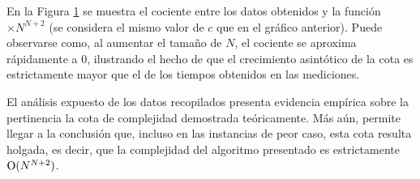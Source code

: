             En la Figura \ref{fig:exp3:part_tiempo_sobre_exp} se muestra el cociente entre los datos obtenidos y la función $\times N^{N + 2}$ (se considera el mismo valor de $c$ que en el gráfico anterior). Puede observarse como, al aumentar el tamaño de $N$, el cociente se aproxima rápidamente a $0$, ilustrando el hecho de que el crecimiento asintótico de la cota es estrictamente mayor que el de los tiempos obtenidos en las mediciones.

            \begin{figure}[H]
                \centering
                \caption{}
                \label{fig:exp3:part_tiempo_sobre_exp}
            \end{figure}

            El análisis expuesto de los datos recopilados presenta evidencia empírica sobre la pertinencia la cota de complejidad demostrada teóricamente. Más aún, permite llegar a la conclusión que, incluso en las instancias de peor caso, esta cota resulta holgada, es decir, que la complejidad del algoritmo presentado es estrictamente $\operatorname{O}(N^{N+2})$.

